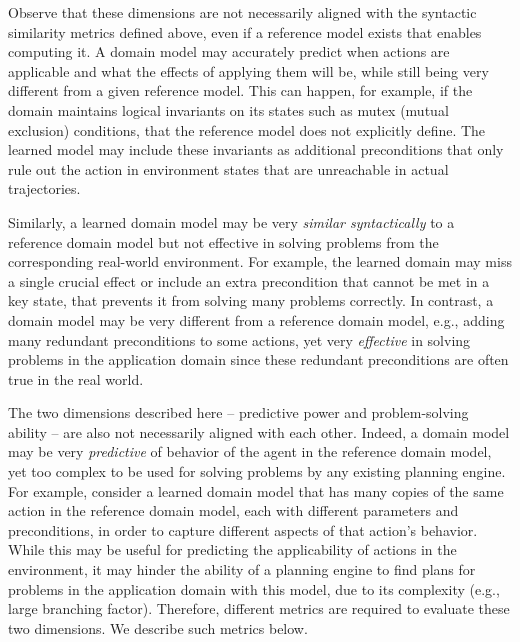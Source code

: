 \documentclass{article}
\theoremstyle{definition}
\theoremstyle{remark}
\newif\ifaddcomments
\newcommand{\roni}[1]{\ifaddcomments{\textcolor{red}{[Roni: #1]}}\fi}
\newcommand{\yarin}[1]{\ifaddcomments{\textcolor{teal}{[Yarin: #1]}}\fi}
\newcommand{\gregor}[1]{\ifaddcomments{\textcolor{orange}{[Gregor: #1]}}\fi}
\begin{document}
Observe that these dimensions are not necessarily aligned with the syntactic similarity metrics defined above, even if a reference model exists that enables computing it.  
A domain model may accurately predict when actions are applicable and what the effects of applying them will be, while still being very different from a given reference model. 
This can happen, for example, if the domain maintains logical invariants on its states such as mutex (mutual exclusion) conditions, that the reference model does not explicitly define. The learned model may include these invariants as additional preconditions that only rule out the action in environment states that are unreachable in actual trajectories.
\gregor{maybe: ``does only define implicitly''?} 
\gregor{I've also put this issue already in the example above. Is this more illustrative?}
Similarly, a learned domain model may be very \emph{similar syntactically} to a reference domain model but not effective in solving problems from the corresponding real-world environment. 
For example, the learned domain may miss a single crucial effect or include an extra precondition that cannot be met in a key state, that prevents it from solving many problems correctly. 
In contrast, a domain model may be very different from a reference domain model, e.g., adding many redundant preconditions to some actions, yet very \emph{effective} in solving problems in the application domain since these redundant preconditions are often true in the real world. 


The two dimensions described here -- predictive power and problem-solving ability -- are also not necessarily aligned with each other. Indeed, a domain model may be very \emph{predictive} of behavior of the agent in the reference domain model, yet too complex to be used for solving problems by any existing planning engine.
For example, consider a learned domain model that has many copies of the same action in the reference domain model, each with different parameters and preconditions, in order to capture different aspects of that action's behavior. 
While this may be useful for predicting the applicability of actions in the environment, 
it may hinder the ability of a planning engine to find plans for problems in the application domain with this model, due to its complexity (e.g., large branching factor). 
Therefore, different metrics are required to evaluate these two dimensions. We describe such metrics below. 
\end{document}
